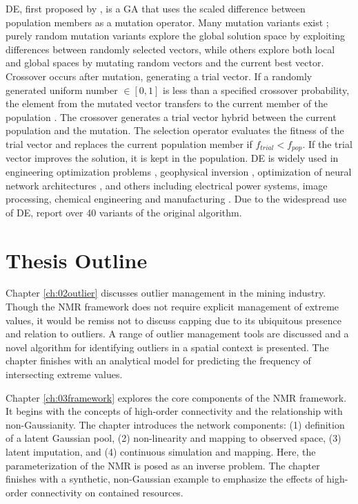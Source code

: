 \Gls{DE}, first proposed by \cite{storn1997differential}, is a \gls{GA} that uses the scaled difference between population members as a mutation operator. Many mutation variants exist \citep{meng2020enhancing}; purely random mutation variants explore the global solution space by exploiting differences between randomly selected vectors, while others explore both local and global spaces by mutating random vectors and the current best vector. Crossover occurs after mutation, generating a trial vector. If a randomly generated uniform number $\in [0,1]$ is less than a specified crossover probability, the element from the mutated vector transfers to the current member of the population \citep{price2013differential}. The crossover generates a trial vector hybrid between the current population and the mutation. The selection operator evaluates the fitness of the trial vector and replaces the current population member if $f_{trial} < f_{pop}$. If the trial vector improves the solution, it is kept in the population. \gls{DE} is widely used in engineering optimization problems \citep{georgioudakis2020comparative}, geophysical inversion \citep{balkaya20173d}, optimization of neural network architectures \citep{unal2022evolutionary, mirjalili2019evolutionary},  and others including electrical power systems, image processing, chemical engineering and manufacturing \citep{bilal2020differential}. Due to the widespread use of \gls{DE}, \cite{ahmad2022differential} report over 40 variants of the original algorithm.

\FloatBarrier
\section{Thesis Outline}
\label{sec:01outline}

Chapter \ref{ch:02outlier} discusses outlier management in the mining industry. Though the \gls{NMR} framework does not require explicit management of extreme values, it would be remiss not to discuss capping due to its ubiquitous presence and relation to outliers. A range of outlier management tools are discussed and a novel algorithm for identifying outliers in a spatial context is presented. The chapter finishes with an analytical model for predicting the frequency of intersecting extreme values.

Chapter \ref{ch:03framework} explores the core components of the \gls{NMR} framework. It begins with the concepts of high-order connectivity and the relationship with non-Gaussianity. The chapter introduces the network components: (1) definition of a latent Gaussian pool, (2) non-linearity and mapping to observed space, (3) latent imputation, and (4) continuous simulation and mapping. Here, the parameterization of the \gls{NMR} is posed as an inverse problem. The chapter finishes with a synthetic, non-Gaussian example to emphasize the effects of high-order connectivity on contained resources.

